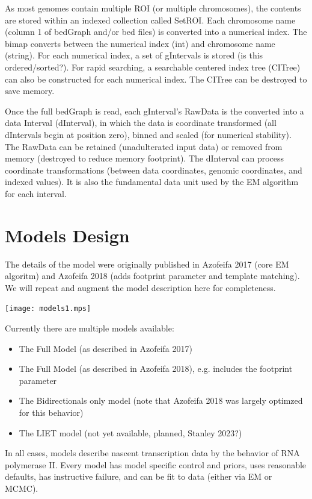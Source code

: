 \documentclass[11pt]{article}
\begin{document}
As most genomes contain multiple ROI (or multiple chromosomes), the contents
are stored within an indexed collection called SetROI.  Each chromosome name 
(column 1 of bedGraph and/or bed files) is converted into a numerical index.
The bimap converts between the numerical index (int) and chromosome name (string).
For each numerical index, a set of gIntervals is stored (is this ordered/sorted?). 
For rapid searching, a searchable centered index tree (CITree) can also be 
constructed for each numerical index.  The CITree can be destroyed to save 
memory.  

Once the full bedGraph is read, each gInterval's RawData is the converted into
a data Interval (dInterval), in which the data is coordinate transformed (all
dIntervals begin at position zero), binned and scaled (for numerical
stability).  The RawData can be retained (unadulterated input data) or removed 
from memory (destroyed to reduce memory footprint).  The dInterval can 
process coordinate transformations (between data coordinates, genomic 
coordinates, and indexed values).  It is also the fundamental data unit 
used by the EM algorithm for each interval.

\section{Models Design}
The details of the model were originally published in Azofeifa 2017 (core EM
    algoritm) and Azofeifa 2018 (adds footprint parameter and template matching).  
We will repeat and augment the model description here for
completeness. 

\texttt{[image: models1.mps]}

Currently there are multiple models available:

\begin{itemize}
\item The Full Model (as described in Azofeifa 2017)
\item The Full Model (as described in Azofeifa 2018), e.g. includes
the footprint parameter
\item The Bidirectionals only model (note that Azofeifa 2018 was largely
    optimzed for this behavior)
\item The LIET model (not yet available, planned, Stanley 2023?)
\end{itemize}

In all cases, models describe nascent transcription data by 
the behavior of RNA polymerase II.   Every model has model specific control
and priors, uses reasonable defaults, has instructive failure, and can 
be fit to data (either via EM or MCMC).
\end{document}
